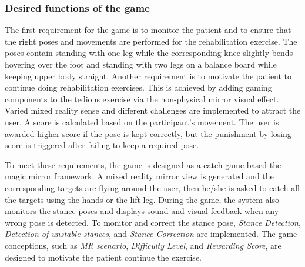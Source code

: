 \subsubsection{Desired functions of the game}
The first requirement for the game is to monitor the patient and to ensure that the right poses and movements are performed for the rehabilitation exercise. The poses contain standing with one leg while the corresponding knee slightly bends hovering over the foot and standing with two legs on a balance board while keeping upper body straight.
Another requirement is to motivate the patient to continue doing rehabilitation exercises. This is achieved by adding gaming components to the tedious exercise via the non-physical mirror visual effect. Varied mixed reality sense and different challenges are implemented to attract the user. A score is calculated based on the participant's movement. The user is awarded higher score if the pose is kept correctly, but the punishment by losing score is triggered after failing to keep a required pose.

To meet these requirements, the game is designed as a catch game based the magic mirror framework. A mixed reality mirror view is generated and the corresponding targets are flying around the user, then he/she is asked to catch all the targets using the hands or the lift leg. During the game, the system also monitors the stance poses and displays sound and visual feedback when any wrong pose is detected. To monitor and correct the stance pose, \textit{Stance Detection}, \textit{Detection of unstable stances}, and \textit{Stance Correction} are implemented. The game conceptions, such as \textit{MR scenario}, \textit{Difficulty Level}, and \textit{Rewarding Score}, are designed to motivate the patient continue the exercise. 

